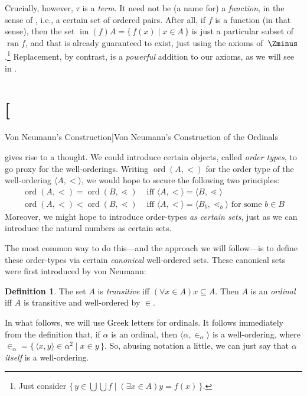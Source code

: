 \documentclass[10pt,a4paper]{article}
\makeatletter
\theoremstyle{plain}
\theoremstyle{definition}
\newtheorem{defn}[thm]{Definition}
\theoremstyle{remark}
\newcommand*{\olfileid}[3]{}
\newcommand*{\olsection}[1]{\section*{#1}}
\newcommand{\olref}{\@ifnextchar[{\olref@i}{\olref@final}}
\def\olref@i[#1]{\@ifnextchar[{\olref@ii}{\olref@final}}
\def\olref@ii[#1]{\@ifnextchar[{\olref@iii}{\olref@final}}
\def\olref@iii[#1]{\olref@final}
\def\olref@final#1{\ref{#1}}
\providecommand{\tuple}[1]{\langle #1 \rangle}
\providecommand{\funimage}[1]{\operatorname{im}(#1)}
\providecommand{\ordeq}[2]{#1 = #2}
\providecommand{\ordtype}[1]{\operatorname{ord}(#1)}
\providecommand{\ran}{\operatorname{ran}}
\providecommand{\Setabs}[2]{\{\, #1 \mid #2 \,\}}
\makeatother
\begin{document}
Crucially, however, $\tau$ is a \emph{term}. It need not be (a name
for) a \emph{function}, in the sense of \olref[sfr][fun][rel]{sec},
i.e., a certain set of ordered pairs. After all, if $f$ is a function
(in that sense), then the set $\funimage{f}{A} = \Setabs{f(x)}{x \in
A}$ is just a particular subset of $\ran{f}$, and that is already
guaranteed to exist, just using the axioms of~$\Zminus$.\footnote{Just
consider $\Setabs{y \in \bigcup \bigcup f}{(\exists x \in A)y =
f(x)}$.} Replacement, by contrast, is a \emph{powerful} addition to
our axioms, as we will see in \olref[sth][replacement][]{chap}.





\olfileid{sth}{ordinals}{vn}	
\olsection[Von Neumann's Construction]{Von Neumann's Construction of the Ordinals}

\olref[sth][ordinals][iso]{thm:woalwayscomparable} gives rise to a
thought. We could introduce certain objects, called \emph{order
types}, to go proxy for the well-orderings. Writing $\ordtype{A, <}$
for the order type of the well-ordering $\tuple{A, <}$, we would hope
to secure the following two principles:
\begin{align*}
	\ordtype{A, <} = \ordtype{B, \lessdot} & 
	\text{ iff } \ordeq{\tuple{A, <}}{\tuple{B, \lessdot}}\\
	\ordtype{A, <} < \ordtype{B, \lessdot}&
	\text{ iff }\ordeq{\tuple{A, <}}{\tuple{B_b, \lessdot_b}}\text{ for some }b \in B
\end{align*}
Moreover, we might hope to introduce order-types \emph{as certain
sets}, just as we can introduce the natural numbers as certain sets. 

The most common way to do this---and the approach we will follow---is
to define these order-types via certain \emph{canonical} well-ordered
sets. These canonical sets were first introduced by von Neumann:

\begin{defn}
The set $A$ is \emph{transitive} {iff} $(\forall x \in A)x \subseteq
A$. Then $A$ is an \emph{ordinal} {iff} $A$ is transitive and
well-ordered by $\in$.
\end{defn}
\noindent
In what follows, we will use Greek letters for ordinals. It follows
immediately from the definition that, if $\alpha$ is an ordinal, then
$\tuple{\alpha, \in_\alpha}$ is a well-ordering, where $\in_\alpha =
\Setabs{\tuple{x, y} \in \alpha^2}{x \in y}$. So, abusing notation a
little, we can just say that $\alpha$ \emph{itself} is a
well-ordering. 
\end{document}
